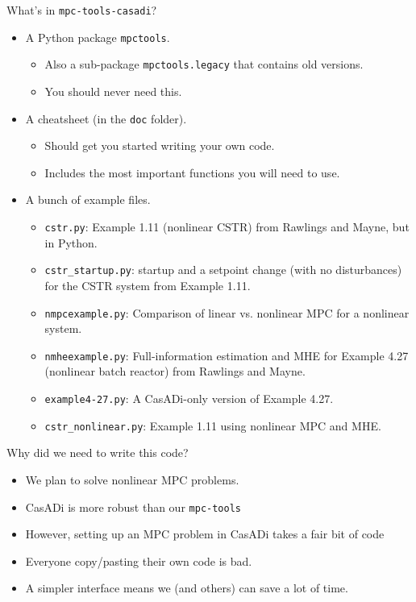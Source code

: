 \documentclass[xcolor=dvipsnames]{beamer}
\begin{document}
\begin{frame}{What's in \texttt{mpc-tools-casadi}?}

\begin{itemize}
    \item A Python package \texttt{mpctools}.
    \begin{itemize}
        \item Also a sub-package \texttt{mpctools.legacy} that contains old versions.
        \item You should never need this.
    \end{itemize}
    \item A cheatsheet (in the \texttt{doc} folder).
    \begin{itemize}
        \item Should get you started writing your own code.
        \item Includes the most important functions you will need to use.
    \end{itemize}
    \item A bunch of example files.
    \begin{itemize}
        \item \texttt{cstr.py}: Example 1.11 (nonlinear CSTR) from Rawlings and Mayne, but in Python.
        \item \texttt{cstr\_startup.py}: startup and a setpoint change (with no disturbances) for the CSTR system from Example 1.11.
        \item \texttt{nmpcexample.py}: Comparison of linear vs. nonlinear MPC for a nonlinear system.
        \item \texttt{nmheexample.py}: Full-information estimation and MHE for  Example 4.27 (nonlinear batch reactor) from Rawlings and Mayne.
        \item \texttt{example4-27.py}: A CasADi-only version of Example 4.27.
        \item \texttt{cstr\_nonlinear.py}: Example 1.11 using nonlinear MPC and MHE. 
    \end{itemize}
\end{itemize}

\end{frame}


\begin{frame}{Why did we need to write this code?}

\begin{itemize}
    \item We plan to solve nonlinear MPC problems.
    \item CasADi is more robust than our \texttt{mpc-tools}
    \item However, setting up an MPC problem in CasADi takes a fair bit of code
    \item Everyone copy/pasting their own code is bad.
    \item A simpler interface means we (and others) can save a lot of time.
\end{itemize}

\end{frame}
\end{document}
